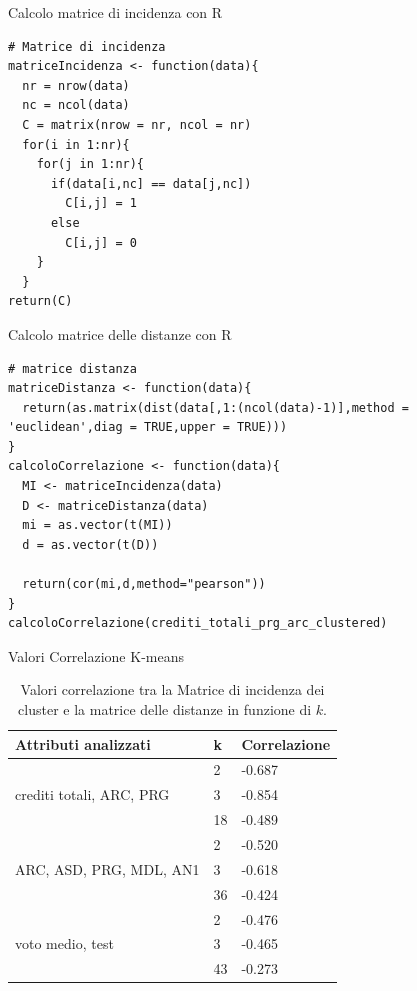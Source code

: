 \documentclass{beamer}
\begin{document}
\begin{frame}[fragile]{Calcolo matrice di incidenza con R}
\begin{lstlisting}[style = R]
# Matrice di incidenza
matriceIncidenza <- function(data){
  nr = nrow(data)
  nc = ncol(data)
  C = matrix(nrow = nr, ncol = nr)
  for(i in 1:nr){
    for(j in 1:nr){
      if(data[i,nc] == data[j,nc])
        C[i,j] = 1
      else
        C[i,j] = 0
    }
  }
return(C)
\end{lstlisting}
\end{frame}

\begin{frame}[fragile]{Calcolo matrice delle distanze con R}
\begin{lstlisting}[style = R]
# matrice distanza
matriceDistanza <- function(data){
  return(as.matrix(dist(data[,1:(ncol(data)-1)],method = 'euclidean',diag = TRUE,upper = TRUE)))
}
calcoloCorrelazione <- function(data){
  MI <- matriceIncidenza(data)
  D <- matriceDistanza(data)
  mi = as.vector(t(MI))
  d = as.vector(t(D))
  
  return(cor(mi,d,method="pearson"))
}
calcoloCorrelazione(crediti_totali_prg_arc_clustered)
\end{lstlisting}
\end{frame}

\begin{frame}{Valori Correlazione K-means}
\begin{table}[H]
\centering
\begin{tabular}{@{}l|l|l@{}}
\hline
\textbf{Attributi analizzati}   							& \textbf{k} & \textbf{Correlazione} \\ \hline
                                							& 2          & -0.687                \\ \cline{2-3} 
crediti totali, ARC, PRG        							& 3          & -0.854                \\ \cline{2-3} 
                                							& 18         & -0.489                \\ \hline
                                							& 2          & -0.520                \\ \cline{2-3} 
ARC, ASD, PRG, MDL,	AN1	\hspace{3em}									& 3          & -0.618                \\ \cline{2-3} 
                                							& 36         & -0.424                \\ \hline
                                							& 2          & -0.476                \\ \cline{2-3} 
voto medio, test                							& 3          & -0.465                \\ \cline{2-3} 
                                							& 43         & -0.273                \\ \hline
\end{tabular}
\caption{Valori correlazione tra la Matrice di incidenza dei cluster e la matrice delle distanze in funzione di $k$.}
\label{tab:corr2}
\end{table}
\end{frame}
\end{document}
